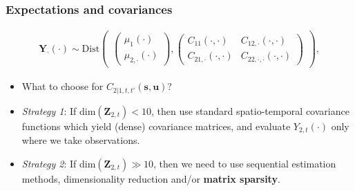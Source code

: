 \documentclass{beamer}
\newcommand{\svec} {\textbf{s}}
\newcommand{\uvec} {\textbf{u}}
\newcommand{\Yvec}{\mathbf{Y}}
\newcommand{\Zvec}{\mathbf{Z}}
\newcommand{\bSigma}{\bm{\Sigma}}
\newcommand{\Dist}{\mathrm{Dist}}
\begin{document}
\begin{frame}
\frametitle{Expectations and covariances}

\begin{align*}
\Yvec_\cdot(\cdot) \sim \Dist\begin{pmatrix} \begin{pmatrix} \mu_1(\cdot) \\ \mu_{2,\cdot}(\cdot) \end{pmatrix},\begin{pmatrix}  C_{11}(\cdot,\cdot) &  C_{12,\cdot}(\cdot,\cdot) \\  C_{21,\cdot}(\cdot,\cdot) &  C_{22,\cdot,\cdot}(\cdot,\cdot) \end{pmatrix} \end{pmatrix},
\end{align*}

\begin{itemize}
\item What to choose for $C_{2|1,t,t'}(\svec,\uvec)$? \vfill
\item \emph{Strategy 1}: If dim$(\Zvec_{2,t}) < 10$, then use standard spatio-temporal covariance functions which yield (dense) covariance matrices, and evaluate $Y_{2,t}(\cdot)$ only where we take observations. \vfill
\item \emph{Strategy 2}: If dim$(\Zvec_{2,t}) \gg 10$, then we need to use sequential estimation methods,  dimensionality reduction and/or {\bf matrix sparsity}. \vfill
\end{itemize}
\end{frame}
\end{document}
